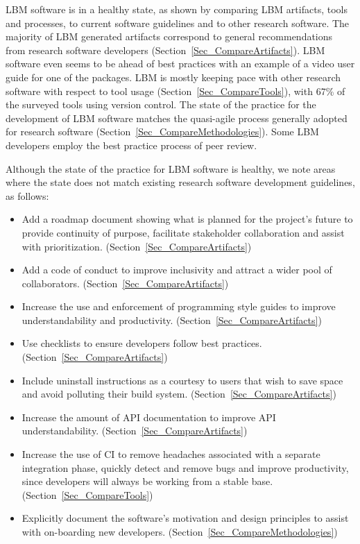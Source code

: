 \documentclass[final, 3p, times, authoryear]{elsarticle}
\begin{document}
LBM software is in a healthy state, as shown by comparing LBM artifacts, tools
and processes, to current software guidelines and to other research software.
The majority of LBM generated artifacts correspond to general recommendations
from research software developers (Section~\ref{Sec_CompareArtifacts}).  LBM
software even seems to be ahead of best practices with an example of a video
user guide for one of the packages. LBM is mostly keeping pace with other
research software with respect to tool usage (Section~\ref{Sec_CompareTools}),
with 67\% of the surveyed tools using version control.  The state of the
practice for the development of LBM software matches the quasi-agile process
generally adopted for research software
(Section~\ref{Sec_CompareMethodologies}).  Some LBM developers employ the best
practice process of peer review.

Although the state of the practice for LBM software is healthy, we note areas
where the state does not match existing research software development
guidelines, as follows:

\begin{itemize}
	\item Add a roadmap document showing what is planned for the project's future
	to provide continuity of purpose, facilitate stakeholder collaboration and
	assist with prioritization. (Section~\ref{Sec_CompareArtifacts})
	\item Add a code of conduct to improve inclusivity and attract a wider pool
	of collaborators. (Section~\ref{Sec_CompareArtifacts})
	\item Increase the use and enforcement of programming style guides to improve understandability and productivity. (Section~\ref{Sec_CompareArtifacts})
	\item Use checklists to ensure developers follow best practices.
	(Section~\ref{Sec_CompareArtifacts})
	\item Include uninstall instructions as a courtesy to users that wish to
	save space and avoid polluting their build system.
	(Section~\ref{Sec_CompareArtifacts})
	\item Increase the amount of API documentation to improve API
	understandability. (Section~\ref{Sec_CompareArtifacts})
	\item Increase the use of CI to remove headaches associated with a separate
	integration phase, quickly detect and remove bugs and improve productivity,
	since developers will always be working from a stable base.
	(Section~\ref{Sec_CompareTools})
	\item Explicitly document the software's motivation and design principles to
	assist with on-boarding new developers.
	(Section~\ref{Sec_CompareMethodologies})
\end{itemize}
\end{document}
